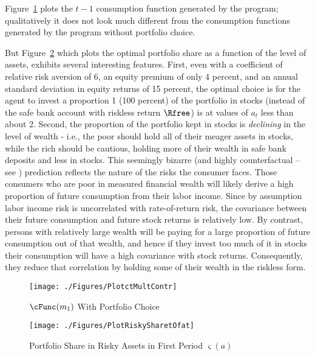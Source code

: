 Figure~\ref{fig:PlotctMultContr} plots the $t-1$ consumption function generated by the program; qualitatively it does not look much different from the consumption functions generated by the program without portfolio choice.

But Figure~\ref{fig:PlotRiskySharetOfat} which plots the optimal portfolio share as a function of the level of assets, exhibits several interesting features.  First, even with a coefficient of relative risk aversion of 6, an equity premium of only 4 percent, and an annual standard deviation in equity returns of 15 percent, the optimal choice is for the agent to invest a proportion 1 (100 percent) of the portfolio in stocks (instead of the safe bank account with riskless return $\Rfree$) is at values of ${a}_{t}$ less than about 2.  Second, the proportion of the portfolio kept in stocks is \textit{declining} in the level of wealth - i.e., the poor should hold all of their meager assets in stocks, while the rich should be cautious, holding more of their wealth in safe bank deposits and less in stocks.  This seemingly bizarre (and highly counterfactual -- see \cite{carroll:richportfolios}) prediction reflects the nature of the risks the consumer faces.  Those consumers who are poor in measured financial wealth will likely derive a high proportion of future consumption from their labor income.  Since by assumption labor income risk is uncorrelated with rate-of-return risk, the covariance between their future consumption and future stock returns is relatively low.  By contrast, persons with relatively large wealth will be paying for a large proportion of future consumption out of that wealth, and hence if they invest too much of it in stocks their consumption will have a high covariance with stock returns.  Consequently, they reduce that correlation by holding some of their wealth in the riskless form.

\hypertarget{PlotctMultContr}{}
\begin{figure}
  \texttt{[image: ./Figures/PlotctMultContr]}
  \caption{$\cFunc({m}_{1})$ With Portfolio Choice}
  \label{fig:PlotctMultContr}
\end{figure}

\hypertarget{PlotRiskySharetOfat}{}
\begin{figure}
  \texttt{[image: ./Figures/PlotRiskySharetOfat]}
  \caption{Portfolio Share in Risky Assets in First Period $\varsigma({a})$}
  \label{fig:PlotRiskySharetOfat}
\end{figure}
